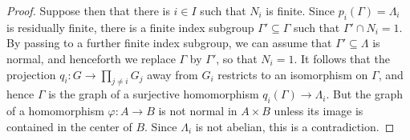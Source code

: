 \documentclass[11pt]{article}
\numberwithin{equation}{section}\providecommand{\llangle}{\langle\!\langle}\providecommand{\rrangle}{\rangle\!\rangle}\providecommand{\Asterisk}{\ast}
\theoremstyle{definition}
\begin{document}
\begin{proof}
Suppose then that there is $i\in I$ such that $N_i$ is finite. Since $p_i(\Gamma)=\Lambda_i$ is residually finite, there is a finite index subgroup $\Gamma'\subseteq \Gamma$ such that $\Gamma'\cap N_i=1$. By passing to a further finite index subgroup, we can assume that $\Gamma'\subseteq\Lambda$ is normal, and henceforth we replace $\Gamma$ by $\Gamma'$, so that $N_i=1$. It follows that the projection $q_i:G\to \prod_{j\neq i} G_j$ away from $G_i$ restricts to an isomorphism on $\Gamma$, and hence $\Gamma$ is the graph of a surjective homomorphism $q_i(\Gamma)\to \Lambda_i$. But the graph of a homomorphism $\varphi:A\to B$ is not normal in $A\times B$ unless its image is contained in the center of $B$. Since $\Lambda_i$ is not abelian, this is a contradiction.
\end{proof}


\end{document}

